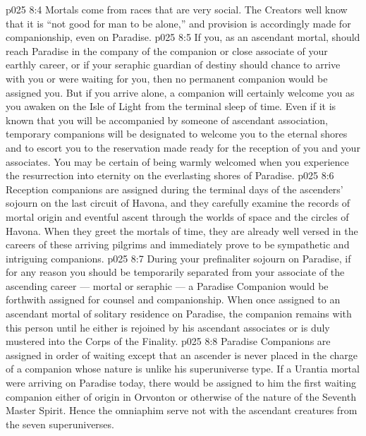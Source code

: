 \vs p025 8:4 Mortals come from races that are very social. The Creators well know that it is “not good for man to be alone,” and provision is accordingly made for companionship, even on Paradise.
\vs p025 8:5 \pc If you, as an ascendant mortal, should reach Paradise in the company of the companion or close associate of your earthly career, or if your seraphic guardian of destiny should chance to arrive with you or were waiting for you, then no permanent companion would be assigned you. But if you arrive alone, a companion will certainly welcome you as you awaken on the Isle of Light from the terminal sleep of time. Even if it is known that you will be accompanied by someone of ascendant association, temporary companions will be designated to welcome you to the eternal shores and to escort you to the reservation made ready for the reception of you and your associates. You may be certain of being warmly welcomed when you experience the resurrection into eternity on the everlasting shores of Paradise.
\vs p025 8:6 Reception companions are assigned during the terminal days of the ascenders’ sojourn on the last circuit of Havona, and they carefully examine the records of mortal origin and eventful ascent through the worlds of space and the circles of Havona. When they greet the mortals of time, they are already well versed in the careers of these arriving pilgrims and immediately prove to be sympathetic and intriguing companions.
\vs p025 8:7 During your prefinaliter sojourn on Paradise, if for any reason you should be temporarily separated from your associate of the ascending career --- mortal or seraphic --- a Paradise Companion would be forthwith assigned for counsel and companionship. When once assigned to an ascendant mortal of solitary residence on Paradise, the companion remains with this person until he either is rejoined by his ascendant associates or is duly mustered into the Corps of the Finality.
\vs p025 8:8 \pc Paradise Companions are assigned in order of waiting except that an ascender is never placed in the charge of a companion whose nature is unlike his superuniverse type. If a Urantia mortal were arriving on Paradise today, there would be assigned to him the first waiting companion either of origin in Orvonton or otherwise of the nature of the Seventh Master Spirit. Hence the omniaphim serve not with the ascendant creatures from the seven superuniverses.
